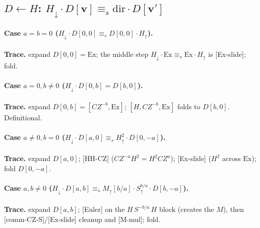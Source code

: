 \documentclass[a4paper]{article}
\newcommand{\lem}[1]{\textsf{[#1]}}      %
\begin{document}
\subsection{$D\leftarrow H$: \; $H_\downarrow\cdot D[\mathbf v]\equiv_s \mathrm{dir}\cdot D[\mathbf v']$}
\begin{center}\end{center}

\paragraph{Case $a=b=0$ \;($H_\downarrow\cdot D[0,0]\equiv_s D[0,0]\cdot H_\uparrow$).}\label{sub:hd00}
\begin{center}\end{center}
\textbf{Trace.} expand $D[0,0]=\mathrm{Ex}$; the middle step $H_\downarrow\cdot\mathrm{Ex}\equiv_s \mathrm{Ex}\cdot H_\uparrow$ is \lem{Ex-slide}; fold.

\paragraph{Case $a=0,b\neq0$ \;($H_\downarrow\cdot D[0,b]=D[b,0]$).}
\begin{center}\end{center}
\textbf{Trace.} expand $D[0,b]=[CZ^{-b},\mathrm{Ex}]$; $[H,CZ^{-b},\mathrm{Ex}]$ folds to $D[b,0]$. Definitional.

\paragraph{Case $a\neq0,b=0$ \;($H_\downarrow\cdot D[a,0]\equiv_s H^2_\uparrow\cdot D[0,-a]$).}\label{sub:hda0}
\begin{center}\end{center}
\textbf{Trace.} expand $D[a,0]$; \lem{HH-CZ} ($CZ^{-a}H^2=H^2CZ^{a}$); \lem{Ex-slide} ($H^2$ across $\mathrm{Ex}$); fold $D[0,-a]$.

\paragraph{Case $a,b\neq0$ \;($H_\downarrow\cdot D[a,b]\equiv_s M_\uparrow[b/a]\cdot S_\uparrow^{b/a}\cdot D[b,-a]$).}
\begin{center}\end{center}
\textbf{Trace.} expand $D[a,b]$; \lem{Euler} on the $H\,S^{-b/a}\,H$ block (creates the $M$), then \lem{comm-CZ-S}/\lem{Ex-slide} cleanup and \lem{M-mul}; fold.
\end{document}
